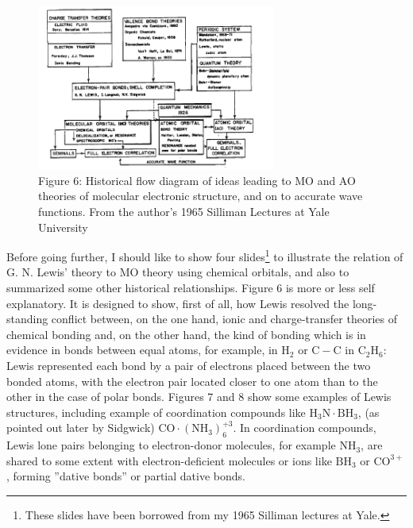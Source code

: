 \documentclass[11pt]{memoir}
\begin{document}
\begin{figure}
\begin{center}
\includegraphics[width=0.7\textwidth]{images/mulliken_figure6.png}
\end{center}
\caption*{Figure 6: Historical flow diagram of ideas leading to MO and AO theories of molecular electronic structure, and on to accurate wave functions.  From the author's 1965 Silliman Lectures at Yale University}
\end{figure}


Before going further, I should like to show four slides\footnote{These slides have been borrowed from my 1965 Silliman lectures at Yale.} to illustrate the relation of G. N. Lewis' theory to MO theory using chemical orbitals, and also to summarized some other historical relationships.  Figure 6 is more or less self explanatory.  It is designed to show, first of all, how Lewis resolved the long-standing conflict between, on the one hand, ionic and charge-transfer theories of chemical bonding and, on the other hand, the kind of bonding which is in evidence in bonds between equal atoms, for example, in $\mathrm{H_2}$ or $\mathrm{C-C}$ in $\mathrm{C_2H_6}$: Lewis represented each bond by a pair of electrons placed between the two bonded atoms, with the electron pair located closer to one atom than to the other in the case of polar bonds.  Figures 7 and 8 show some examples of Lewis structures, including example of coordination compounds like $\mathrm{H_3N \cdot BH_3}$, (as pointed out later by Sidgwick) $\mathrm{CO \cdot (NH_3)_6^{+3}}$.  In coordination compounds, Lewis lone pairs belonging to electron-donor molecules, for example $\mathrm{NH_3}$, are shared to some extent with electron-deficient molecules or ions like $\mathrm{BH_3}$ or $\mathrm{CO^{3+}}$, forming ''dative bonds'' or partial dative bonds.
\end{document}
